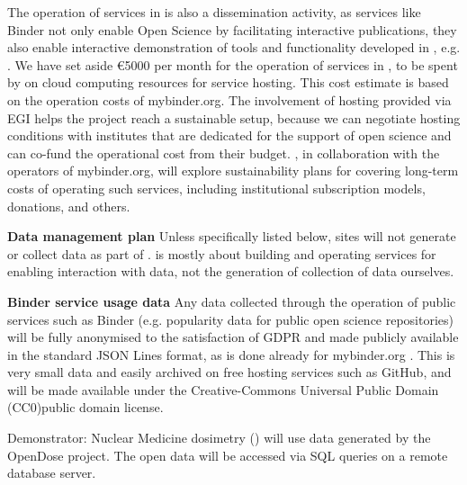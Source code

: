 The operation of services in  is also a dissemination activity,
as services like Binder not only enable Open Science by facilitating interactive publications,
they also enable interactive demonstration of tools and functionality
developed in \TheProject, e.g. .
We have set aside \euro 5000 per month for the operation of services in ,
to be spent by  on cloud computing resources for service hosting.
This cost estimate is based on the operation costs of mybinder.org.
The involvement of hosting provided via EGI helps the project reach a sustainable setup, because we can negotiate hosting conditions with institutes that are dedicated for the support of open science and can co-fund the operational cost from their budget.
\TheProject, in collaboration with the operators of mybinder.org,
will explore sustainability plans for covering long-term costs of operating such services,
including institutional subscription models, donations, and others.

\noindent \textbf{Data management plan}
\label{sec:data-management-plan}
Unless specifically listed below,
sites will not generate or collect data as part of \TheProject.
\TheProject is mostly about building and operating services
for enabling interaction with data,
not the generation of collection of data ourselves.

\noindent \textbf{Binder service usage data}
Any data collected through the operation of public services such as Binder
(e.g. popularity data for public open science repositories)
will be fully anonymised to the satisfaction of GDPR
and made publicly available in the standard JSON Lines format,
as is done already for mybinder.org \cite{mybinder-archive}.
This is very small data and easily archived on free hosting services such as GitHub,
and will be made available under the Creative-Commons Universal Public Domain (CC0)public domain license.


Demonstrator: Nuclear Medicine dosimetry
() will use data generated by the
OpenDose project. The open data will be accessed via SQL queries on a remote
database server.

